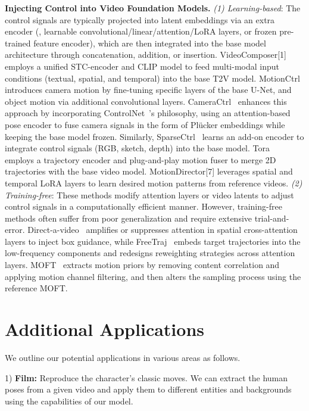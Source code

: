 \noindent \textbf{Injecting Control into Video Foundation Models.} \textit{(1) Learning-based}: The control signals are typically projected into latent embeddings via an extra encoder (\eg, learnable convolutional/linear/attention/LoRA layers, or frozen pre-trained feature encoder), which are then integrated into the base model architecture through concatenation, addition, or insertion. VideoComposer[1] employs a unified STC-encoder and CLIP model to feed multi-modal input conditions (textual, spatial, and temporal) into the base T2V model. MotionCtrl~\citep{wang2024motionctrl} introduces camera motion by fine-tuning specific layers of the base U-Net, and object motion via additional convolutional layers. CameraCtrl~\citep{he2024cameractrl} enhances this approach by incorporating ControlNet~\citep{zhang2023adding}'s philosophy, using an attention-based pose encoder to fuse camera signals in the form of Plücker embeddings while keeping the base model frozen. Similarly, SparseCtrl~\citep{guo2023sparsectrl} learns an add-on encoder to integrate control signals (RGB, sketch, depth) into the base model. Tora~\citep{zhang2024tora} employs a trajectory encoder and plug-and-play motion fuser to merge 2D trajectories with the base video model. MotionDirector[7] leverages spatial and temporal LoRA layers to learn desired motion patterns from reference videos.
\textit{(2) Training-free}: These methods modify attention layers or video latents to adjust control signals in a computationally efficient manner. However, training-free methods often suffer from poor generalization and require extensive trial-and-error. Direct-a-video~\citep{yang2024direct} amplifies or suppresses attention in spatial cross-attention layers to inject box guidance, while FreeTraj~\citep{qiu2024freetraj} embeds target trajectories into the low-frequency components and redesigns reweighting strategies across attention layers. MOFT~\citep{xiao2024video} extracts motion priors by removing content correlation and applying motion channel filtering, and then alters the sampling process using the reference MOFT. 

\section{Additional Applications}

We outline our potential applications in various areas as follows.

1) \textbf{Film:} Reproduce the character's classic moves. We can extract the human poses from a given video and apply them to different entities and backgrounds using the capabilities of our model.

